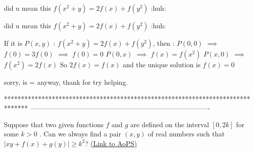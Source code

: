 \begin{mysolution}
	did u mean this $f(x^{2}+y)=2f(x)+f(y^{2})$ :huh:
\end{mysolution}



\begin{mysolution}
	\begin{tcolorbox}did u mean this $f(x^{2}+y)=2f(x)+f(y^{2})$ :huh:\end{tcolorbox}

If it is $P(x,y)$ : $f(x^{2}+y)=2f(x)+f(y^{2})$, then :
$P(0,0)$ $\implies$  $f(0)=3f(0)$ $\implies$ $f(0)=0$
$P(0,x)$ $\implies$ $f(x)=f(x^{2})$
$P(x,0)$ $\implies$ $f(x^{2})=2f(x)$
So $2f(x)=f(x)$ and the unique solution is $f(x)=0$
\end{mysolution}



\begin{mysolution}
	sorry, is =
anyway, thank for try helping.
\end{mysolution}
*******************************************************************************
-------------------------------------------------------------------------------

\begin{problem}
	Suppose that two given functions $f$ and $g$ are defined on the interval $[0,2k]$ for some $k>0$ . Can we always find a pair $(x,y)$ of real numbers such that $|xy+f(x)+g(y)|\geq k^{2}$?
	\flushright \href{https://artofproblemsolving.com/community/c6h155063}{(Link to AoPS)}
\end{problem}



